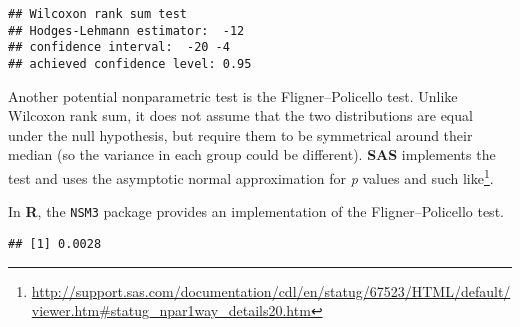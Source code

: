 \documentclass[
]{book}
\newenvironment{Shaded}{\begin{snugshade}}{\end{snugshade}}
\newcommand{\DecValTok}[1]{\textcolor[rgb]{0.00,0.00,0.81}{#1}}
\newcommand{\KeywordTok}[1]{\textcolor[rgb]{0.13,0.29,0.53}{\textbf{#1}}}
\newcommand{\NormalTok}[1]{#1}
\newcommand{\OperatorTok}[1]{\textcolor[rgb]{0.81,0.36,0.00}{\textbf{#1}}}
\newcommand{\StringTok}[1]{\textcolor[rgb]{0.31,0.60,0.02}{#1}}
\renewcommand{\href}[2]{#2\footnote{\url{#1}}}
\begin{document}
\begin{Shaded}
\end{Shaded}

\begin{verbatim}
## Wilcoxon rank sum test 
## Hodges-Lehmann estimator:  -12 
## confidence interval:  -20 -4 
## achieved confidence level: 0.95
\end{verbatim}

Another potential nonparametric test is the Fligner--Policello test. Unlike Wilcoxon rank sum, it does not assume that the two distributions are equal under the null hypothesis, but require them to be symmetrical around their median (so the variance in each group could be different). \href{http://support.sas.com/documentation/cdl/en/statug/67523/HTML/default/viewer.htm\#statug_npar1way_details20.htm}{\textbf{SAS} implements the test and uses the asymptotic normal approximation for \emph{p} values and such like}.

In \textbf{R}, the \texttt{NSM3} package provides an implementation of the Fligner--Policello test.

\begin{Shaded}
\end{Shaded}

\begin{verbatim}
## [1] 0.0028
\end{verbatim}
\end{document}
